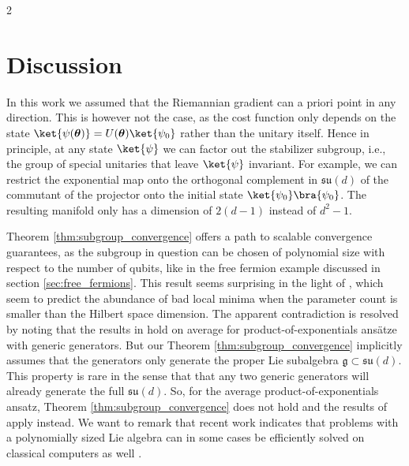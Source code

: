 \documentclass{article}
\renewcommand{\vec}[1]{\ensuremath{\boldsymbol{#1}}}
\begin{document}
\begin{multicols}{2}
\section{Discussion}
In this work we assumed that the Riemannian gradient can a priori point in any direction.
This is however not the case, as the cost function only depends on the state \(\ket{\psi(\vec{\theta})} = U(\vec{\theta})\ket{\psi_0}\) rather than the unitary itself.
Hence in principle, at any state \(\ket{\psi}\) we can factor out the stabilizer subgroup, i.e., the group of special unitaries that leave \(\ket{\psi}\) invariant.
For example, we can restrict the exponential map onto the orthogonal complement in \(\mathfrak{su}(d)\) of the commutant of the projector onto the initial state \(\ket{\psi_0}\bra{\psi_0}\).
The resulting manifold only has a dimension of \(2(d-1)\) instead of \(d^2-1\).

Theorem \ref{thm:subgroup_convergence} offers a path to scalable convergence guarantees, as the subgroup in question can be chosen of polynomial size with respect to the number of qubits, like in the free fermion example discussed in section \ref{sec:free_fermions}.
This result seems surprising in the light of \cite{VQA_traps, anschuetz_critical_2021}, which seem to predict the abundance of bad local minima when the parameter count is smaller than the Hilbert space dimension.
The apparent contradiction is resolved by noting that the results in \cite{VQA_traps, anschuetz_critical_2021} hold on average for product-of-exponentials ansätze with generic generators.
But our Theorem \ref{thm:subgroup_convergence} implicitly assumes that the generators only generate the proper Lie subalgebra \(\mathfrak{g} \subset \mathfrak{su}(d)\).
This property is rare in the sense that that any two generic generators will already generate the full \(\mathfrak{su}(d)\).
So, for the average product-of-exponentials ansatz, Theorem \ref{thm:subgroup_convergence} does not hold and the results of \cite{VQA_traps, anschuetz_critical_2021} apply instead.
We want to remark that recent work indicates that problems with a polynomially sized Lie algebra can in some cases be efficiently solved on classical computers as well \cite{goh_lie-algebraic_2025}.


\end{multicols}
\end{document}
